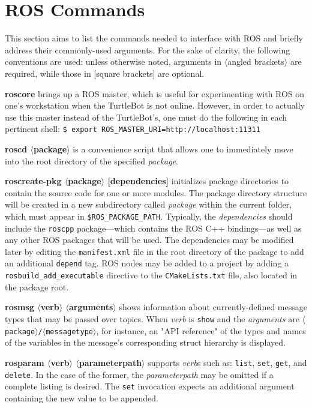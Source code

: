 \documentclass[12pt]{report}
\begin{document}
\section{ROS Commands}
This section aims to list the commands needed to interface with ROS and briefly address their commonly-used arguments.  For the sake of clarity, the following conventions are used: unless otherwise noted, arguments in $\langle$angled brackets$\rangle$ are required, while those in [square brackets] are optional.
\begin{itemize}
\item{\textbf{roscore} brings up a ROS master, which is useful for experimenting with ROS on one's workstation when the TurtleBot is not online.  However, in order to actually use this master instead of the TurtleBot's, one must do the following in each pertinent shell: \texttt{\$\ export ROS\_MASTER\_URI=http://localhost:11311}}
\item{\textbf{roscd $\langle$package$\rangle$} is a convenience script that allows one to immediately move into the root directory of the specified \textit{package}.}
\item{\textbf{roscreate-pkg $\langle$package$\rangle$ [dependencies]} initializes package directories to contain the source code for one or more modules.  The package directory structure will be created in a new subdirectory called \textit{package} within the current folder, which must appear in \texttt{\$ROS\_PACKAGE\_PATH}.  Typically, the \textit{dependencies} should include the \texttt{roscpp} package---which contains the ROS C++ bindings---as well as any other ROS packages that will be used.  The dependencies may be modified later by editing the \texttt{manifest.xml} file in the root directory of the package to add an additional \texttt{depend} tag.  ROS nodes may be added to a project by adding a \texttt{rosbuild\_add\_executable} directive to the \texttt{CMakeLists.txt} file, also located in the package root.}
\begin{sloppypar}
\item{\textbf{rosmsg $\langle$verb$\rangle$ $\langle$arguments$\rangle$} shows information about currently-defined message types that may be passed over topics.  When \textit{verb} is \texttt{show} and the \textit{arguments} are \texttt{$\langle$package$\rangle$/$\langle$messagetype$\rangle$}, for instance, an "API reference" of the types and names of the variables in the message's corresponding struct hierarchy is displayed.}
\end{sloppypar}
\item{\textbf{rosparam $\langle$verb$\rangle$ $\langle$parameterpath$\rangle$} supports \textit{verb}s such as: \texttt{list}, \texttt{set}, \texttt{get}, and \texttt{delete}.  In the case of the former, the \textit{parameterpath} may be omitted if a complete listing is desired.  The \texttt{set} invocation expects an additional argument containing the new value to be appended.}

\end{itemize}
\end{document}
